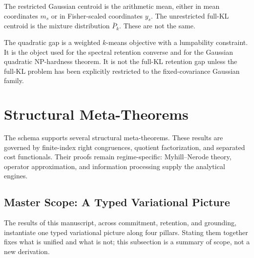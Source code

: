 \documentclass[12pt]{article}
\theoremstyle{definition}
\begin{document}
The restricted Gaussian centroid is the arithmetic mean, either in mean
coordinates $m_s$ or in Fisher-scaled coordinates $y_s$.  The unrestricted
full-KL centroid is the mixture distribution $\bar P_k$.  These are not the
same.

The quadratic gap is a weighted $k$-means objective with a lumpability
constraint.  It is the object used for the spectral retention converse and for
the Gaussian quadratic NP-hardness theorem.  It is not the full-KL retention
gap unless the full-KL problem has been explicitly restricted to the
fixed-covariance Gaussian family.

\section{Structural Meta-Theorems}
\label{sec:meta}

The schema supports several structural meta-theorems.  These results are
governed by finite-index right congruences, quotient factorization, and
separated cost functionals.  Their proofs remain regime-specific:
Myhill--Nerode theory, operator approximation, and information processing
supply the analytical engines.

\subsection{Master Scope: A Typed Variational Picture}
\label{subsec:meta-scope}

The results of this manuscript, across commitment, retention, and grounding,
instantiate one typed variational picture along four pillars.  Stating them
together fixes what is unified and what is not; this subsection is a summary
of scope, not a new derivation.
\end{document}
